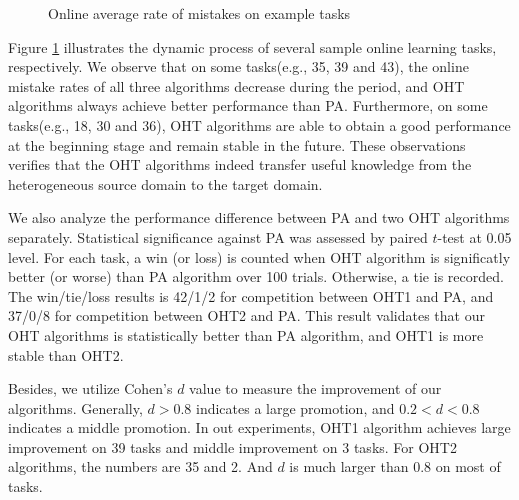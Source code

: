 \documentclass[letterpaper]{article}
\begin{document}
\begin{figure}[!htb]
{  }
  \caption{Online average rate of mistakes on example tasks}
  \label{Online average rate of mistakes on example tasks}
\end{figure}

Figure \ref{Online average rate of mistakes on example tasks} illustrates the dynamic process of several sample online learning tasks, respectively.
We observe that on some tasks(e.g., 35, 39 and 43), the online mistake rates of all three algorithms decrease during the period, and OHT algorithms always achieve better performance than PA.
Furthermore, on some tasks(e.g., 18, 30 and 36), OHT algorithms are able to obtain a good performance at the beginning stage and remain stable in the future.
These observations verifies that the OHT algorithms indeed transfer useful knowledge from the heterogeneous source domain to the target domain. 

We also analyze the performance difference between PA and two OHT algorithms separately.
Statistical significance against PA was assessed by paired $t$-test at 0.05 level.
For each task, a win (or loss) is counted when OHT algorithm is significatly better (or worse) than PA algorithm over 100 trials.
Otherwise, a tie is recorded.
The win/tie/loss results is 42/1/2 for competition between OHT1 and PA, and 37/0/8 for competition between  OHT2 and PA.
This result validates that our OHT algorithms is statistically better than PA algorithm, and OHT1 is more stable than OHT2.

Besides, we utilize Cohen's $d$ value to measure the improvement of our algorithms.
Generally, $d>0.8$ indicates a large promotion, and $0.2<d<0.8$ indicates a middle promotion.
In out experiments, OHT1 algorithm achieves large improvement on 39 tasks and middle improvement on 3 tasks.
For OHT2 algorithms, the numbers are 35 and 2.
And $d$ is much larger than $0.8$ on most of tasks.
\end{document}

